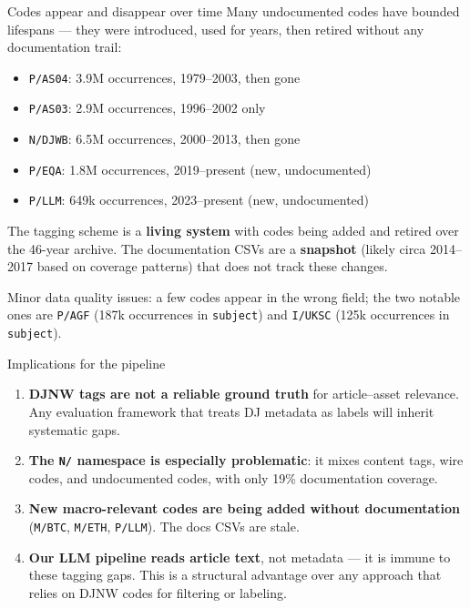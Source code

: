 \documentclass[10pt,aspectratio=169]{beamer}
\begin{document}
\begin{frame}{Codes appear and disappear over time}
  \small
  Many undocumented codes have bounded lifespans --- they were introduced,
  used for years, then retired without any documentation trail:

  \begin{itemize}
    \item \texttt{P/AS04}: 3.9M occurrences, 1979--2003, then gone
    \item \texttt{P/AS03}: 2.9M occurrences, 1996--2002 only
    \item \texttt{N/DJWB}: 6.5M occurrences, 2000--2013, then gone
    \item \texttt{P/EQA}: 1.8M occurrences, 2019--present (new, undocumented)
    \item \texttt{P/LLM}: 649k occurrences, 2023--present (new, undocumented)
  \end{itemize}

  \medskip
  The tagging scheme is a \textbf{living system} with codes being added and
  retired over the 46-year archive. The documentation CSVs are a
  \textbf{snapshot} (likely circa 2014--2017 based on coverage patterns) that
  does not track these changes.

  \medskip
  Minor data quality issues: a few codes appear in the wrong field; the
  two notable ones are \texttt{P/AGF} (187k occurrences in \texttt{subject})
  and \texttt{I/UKSC} (125k occurrences in \texttt{subject}).
\end{frame}

\begin{frame}{Implications for the pipeline}
  \small
  \begin{enumerate}
    \item \textbf{DJNW tags are not a reliable ground truth} for
          article--asset relevance. Any evaluation framework that treats DJ
          metadata as labels will inherit systematic gaps.
    \item \textbf{The \texttt{N/} namespace is especially problematic}:
          it mixes content tags, wire codes, and undocumented codes,
          with only 19\% documentation coverage.
    \item \textbf{New macro-relevant codes are being added without
          documentation} (\texttt{M/BTC}, \texttt{M/ETH}, \texttt{P/LLM}).
          The docs CSVs are stale.
    \item \textbf{Our LLM pipeline reads article text}, not metadata ---
          it is immune to these tagging gaps. This is a structural advantage
          over any approach that relies on DJNW codes for filtering or
          labeling.
  \end{enumerate}
\end{frame}

\end{document}
